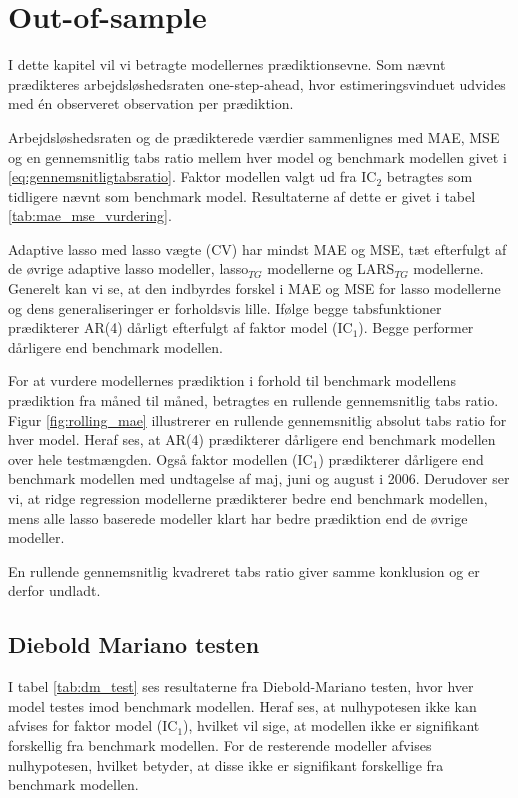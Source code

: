 \chapter{Out-of-sample} \label{ch:out-of-sample}
I dette kapitel vil vi betragte modellernes prædiktionsevne.
Som nævnt prædikteres arbejdsløshedsraten one-step-ahead, hvor estimeringsvinduet udvides med én observeret observation per prædiktion.

Arbejdsløshedsraten og de prædikterede værdier sammenlignes med MAE, MSE og en gennemsnitlig tabs ratio mellem hver model og benchmark modellen givet i \eqref{eq:gennemsnitligtabsratio}.
Faktor modellen valgt ud fra IC\(_2\) betragtes som tidligere nævnt som benchmark model.
Resultaterne af dette er givet i tabel \ref{tab:mae_mse_vurdering}.



Adaptive lasso med lasso vægte (CV) har mindst MAE og MSE, tæt efterfulgt af de øvrige adaptive lasso modeller, lasso\(_{TG}\) modellerne og LARS\(_{TG}\) modellerne.
Generelt kan vi se, at den indbyrdes forskel i MAE og MSE for lasso modellerne og dens generaliseringer er forholdsvis lille.
Ifølge begge tabsfunktioner prædikterer AR(4) dårligt efterfulgt af faktor model (IC\(_1\)).
Begge performer dårligere end benchmark modellen.

For at vurdere modellernes prædiktion i forhold til benchmark modellens prædiktion fra måned til måned, betragtes en rullende gennemsnitlig tabs ratio.
Figur \ref{fig:rolling_mae} illustrerer en rullende gennemsnitlig absolut tabs ratio for hver model. 
Heraf ses, at AR(4) prædikterer dårligere end benchmark modellen over hele testmængden.
Også faktor modellen (IC\(_1\)) prædikterer dårligere end benchmark modellen med undtagelse af maj, juni og august i 2006.
Derudover ser vi, at ridge regression modellerne prædikterer bedre end benchmark modellen, mens alle lasso baserede modeller klart har bedre prædiktion end de øvrige modeller.
%

En rullende gennemsnitlig kvadreret tabs ratio giver samme konklusion og er derfor undladt.


\section{Diebold Mariano testen}
I tabel \ref{tab:dm_test} ses resultaterne fra Diebold-Mariano testen, hvor hver model testes imod benchmark modellen.
Heraf ses, at nulhypotesen ikke kan afvises for faktor model (IC\(_1\)), hvilket vil sige, at modellen ikke er signifikant forskellig fra benchmark modellen.
For de resterende modeller afvises nulhypotesen, hvilket betyder, at disse ikke er signifikant forskellige fra benchmark modellen.
\newpage
%

%
